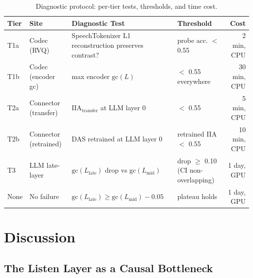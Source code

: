 \documentclass{article}
\newcommand{\gc}{\text{gc}}
\newcommand{\iia}{\text{IIA}}
\begin{document}
\begin{table}[h]
  \caption{Diagnostic protocol: per-tier tests, thresholds, and time cost.}
  \label{tab:diagnostic}
  \centering
  \small
  \begin{tabular}{llp{4.5cm}p{2.5cm}r}
    \toprule
    \textbf{Tier} & \textbf{Site} & \textbf{Diagnostic Test}
      & \textbf{Threshold} & \textbf{Cost} \\
    \midrule
    T1a & Codec (RVQ)           & SpeechTokenizer L1 reconstruction preserves contrast? & probe acc. $<$ 0.55 & 2 min, CPU \\
    T1b & Codec (encoder gc)    & max encoder $\gc(L)$ & $<$ 0.55 everywhere & 30 min, CPU \\
    T2a & Connector (transfer)  & $\iia_\text{transfer}$ at LLM layer 0 & $<$ 0.55 & 5 min, CPU \\
    T2b & Connector (retrained) & DAS retrained at LLM layer 0 & retrained IIA $<$ 0.55 & 10 min, CPU \\
    T3  & LLM late-layer        & $\gc(L_\text{late})$ drop vs $\gc(L_\text{mid})$ & drop $\geq$ 0.10 (CI non-overlapping) & 1 day, GPU \\
    None & No failure           & $\gc(L_\text{late}) \geq \gc(L_\text{mid}) - 0.05$ & plateau holds & 1 day, GPU \\
    \bottomrule
  \end{tabular}
\end{table}

\section{Discussion}
\label{sec:discussion}

%

\subsection{The Listen Layer as a Causal Bottleneck}
\label{sec:disc_bottleneck}
\end{document}
